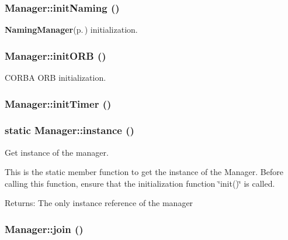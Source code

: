 \subsubsection{\setlength{\rightskip}{0pt plus 5cm}Manager::init\-Naming ()}\label{classManager_Managera32}


{\bf Naming\-Manager}{\rm (p.\,\pageref{classNamingManager})} initialization. 

\subsubsection{\setlength{\rightskip}{0pt plus 5cm}Manager::init\-ORB ()}\label{classManager_Managera29}


CORBA ORB initialization. 

\subsubsection{\setlength{\rightskip}{0pt plus 5cm}Manager::init\-Timer ()}\label{classManager_Managera35}


\subsubsection{\setlength{\rightskip}{0pt plus 5cm}static Manager::instance ()\hspace{0.3cm}{\tt  [static]}}\label{classManager_Managere1}


Get instance of the manager. 

This is the static member function to get the instance of the Manager. Before calling this function, ensure that the initialization function \char`\"{}init()\char`\"{} is called.

\begin{Desc}
\item[Returns:]The only instance reference of the manager\end{Desc}
\subsubsection{\setlength{\rightskip}{0pt plus 5cm}Manager::join ()}\label{classManager_Managera3}


